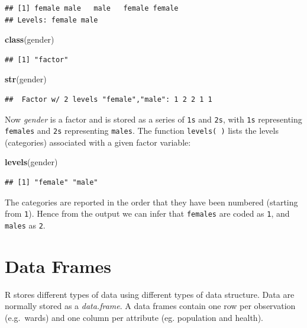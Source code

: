 \documentclass[]{book}
\newenvironment{Shaded}{\begin{snugshade}}{\end{snugshade}}
\newcommand{\KeywordTok}[1]{\textcolor[rgb]{0.13,0.29,0.53}{\textbf{#1}}}
\newcommand{\NormalTok}[1]{#1}
\begin{document}
\begin{verbatim}
## [1] female male   male   female female
## Levels: female male
\end{verbatim}

\begin{Shaded}
\begin{Highlighting}[]
\KeywordTok{class}\NormalTok{(gender)}
\end{Highlighting}
\end{Shaded}

\begin{verbatim}
## [1] "factor"
\end{verbatim}

\begin{Shaded}
\begin{Highlighting}[]
\KeywordTok{str}\NormalTok{(gender)}
\end{Highlighting}
\end{Shaded}

\begin{verbatim}
##  Factor w/ 2 levels "female","male": 1 2 2 1 1
\end{verbatim}

Now \emph{gender} is a factor and is stored as a series of \texttt{1s} and \texttt{2s}, with \texttt{1s} representing \texttt{females} and \texttt{2s} representing \texttt{males}. The function \texttt{levels(\ )} lists the levels (categories) associated with a given factor variable:

\begin{Shaded}
\begin{Highlighting}[]
\KeywordTok{levels}\NormalTok{(gender)}
\end{Highlighting}
\end{Shaded}

\begin{verbatim}
## [1] "female" "male"
\end{verbatim}

The categories are reported in the order that they have been numbered (starting from \texttt{1}). Hence from the output we can infer that \texttt{females} are coded as \texttt{1}, and \texttt{males} as \texttt{2}.

\hypertarget{data-frames}{%
\section{Data Frames}\label{data-frames}}

R stores different types of data using different types of data structure. Data are normally stored as a \emph{data.frame}. A data frames contain one row per observation (e.g.~wards) and one column per attribute (eg. population and health).
\end{document}
